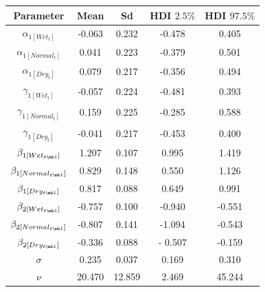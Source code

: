 \documentclass[11pt,a4paper]{article}
\begin{document}
\begin{center}
\begin{tabular}{ |c|c|c|c|c| }
 \hline
 Parameter & Mean & Sd & HDI $2.5\%$ & HDI $97.5\%$ \\ 
 \hline
$\alpha_{1[Wet_{t}]}$ & 	-0.063 &	0.232 &	-0.478 &	0.405 		 \\
$\alpha_{1[Normal_{t}]}$ & 0.041 &	0.223 &	-0.379 &	0.501 	 \\
$\alpha_{1[Dry_{t}]}$ & 	 0.079 &	0.217 &	-0.356 &	0.494	 \\
$\gamma_{1[Wet_{t}]}$ & 	-0.057 	& 0.224 &	-0.481 &	0.393 	 \\
$\gamma_{1[Normal_{t}]}$ & 0.159 &	0.225 &	-0.285 &	0.588 \\
$\gamma_{1[Dry_{t}]}$ & 	 	-0.041 &	0.217 &	-0.453 &	0.400 	 \\
$\beta_{1[Wet_{t \mh 1}]}$ & 	 	1.207 &	0.107 &	0.995 &	1.419 	 \\
$\beta_{1[Normal_{t \mh 1}]}$ 	& 0.829 &	0.148 &	0.550 &	1.126	\\
$\beta_{1[Dry_{t \mh 1}]}$ & 0.817 &	0.088 &	0.649 &	0.991 \\
$\beta_{2[Wet_{t \mh 1}]}$ & 	-0.757 	& 0.100 & -0.940 & 	-0.551 	 \\
$\beta_{2[Normal_{t \mh 1}]}$ 	& -0.807 &	0.141 &	-1.094 &	-0.543 	\\
$\beta_{2[Dry_{t \mh 1}]}$ & 	-0.336 	& 0.088 & 	- 0.507 &  -0.159 \\
$\sigma$ & 0.235 & 	0.037 & 	0.169 & 	0.310 \\
$\nu$ 	& 20.470 & 	12.859 & 2.469 &  	45.244 \\
\hline
\end{tabular}
\end{center}


\newpage
\printbibliography
\end{document}
